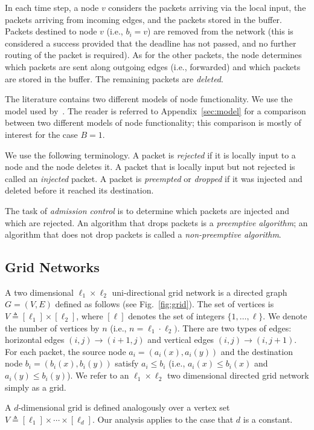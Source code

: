 \documentclass[11pt]{article}
\newenvironment{proof sketch}[1]{\noindent {\emph{Proof sketch of #1:}}}{\hfill \qed}
\begin{document}
In each time step, a node $v$ considers the packets arriving via the local input, the packets arriving from incoming edges, and the packets stored in the buffer.  Packets destined to node $v$ (i.e., $b_i=v$) are removed from the network (this is considered a success provided that the deadline has not passed, and no further routing of the packet is required). As for the other packets, the node determines which packets are sent along outgoing edges (i.e., forwarded) and which packets are stored in the buffer. The remaining packets are \emph{deleted}.

The literature contains two different models of node functionality. We use the model used by~\cite{ARSU,RR}. The reader is referred to Appendix~\ref{sec:model} for a comparison between two different models of node functionality; this comparison is mostly of interest for the case $B=1$.

We use the following terminology.  A packet is \emph{rejected} if it is locally input to a node and the node deletes it. A packet that is locally input but not rejected is called an \emph{injected} packet. A packet is \emph{preempted} or \emph{dropped} if it was injected and deleted before it reached its destination.


The task of \emph{admission control} is to determine which packets are injected and which are rejected.  An algorithm that drops packets is a \emph{preemptive algorithm}; an algorithm that does not drop packets is called a \emph{non-preemptive algorithm}.

\subsection{Grid Networks}
A two dimensional $\ell_1\times \ell_2$ uni-directional
grid network is a directed graph $G=(V,E)$ defined as
follows (see Fig.~\ref{fig:grid}). The set of vertices is
$V\triangleq[\ell_1]\times [\ell_2]$, where $[\ell]$
denotes the set of integers $\{1,\ldots,\ell\}$.  We denote
the number of vertices by $n$ (i.e., $n=\ell_1\cdot
\ell_2)$.  There are two types of edges: horizontal edges
$(i,j)\rightarrow (i+1,j)$ and vertical edges
$(i,j)\rightarrow (i,j+1)$. For each packet, the source
node $a_i=(a_i(x),a_i(y))$ and the destination node
$b_i=(b_i(x),b_i(y))$ satisfy $a_i \leq b_i$ (i.e.,
$a_i(x)\leq b_i(x)$ and $a_i(y)\leq b_i(y)$).  We refer to
an $\ell_1\times \ell_2$ two dimensional directed grid
network simply as a grid.

A $d$-dimensional grid is defined analogously over a vertex set
$V\triangleq[\ell_1]\times \cdots \times [\ell_d]$. Our analysis applies to the case
that $d$ is a constant.
\end{document}
